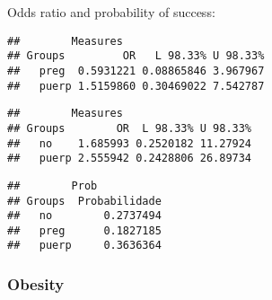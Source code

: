 \documentclass[
]{article}
\newenvironment{Shaded}{\begin{snugshade}}{\end{snugshade}}
\newcommand{\CommentTok}[1]{\textcolor[rgb]{0.56,0.35,0.01}{\textit{#1}}}
\newcommand{\KeywordTok}[1]{\textcolor[rgb]{0.13,0.29,0.53}{\textbf{#1}}}
\newcommand{\NormalTok}[1]{#1}
\newcommand{\OperatorTok}[1]{\textcolor[rgb]{0.81,0.36,0.00}{\textbf{#1}}}
\newcommand{\StringTok}[1]{\textcolor[rgb]{0.31,0.60,0.02}{#1}}
\begin{document}
Odds ratio and probability of success:

\begin{Shaded}
\end{Shaded}

\begin{verbatim}
##        Measures
## Groups         OR   L 98.33% U 98.33%
##   preg  0.5931221 0.08865846 3.967967
##   puerp 1.5159860 0.30469022 7.542787
\end{verbatim}

\begin{Shaded}
\end{Shaded}

\begin{verbatim}
##        Measures
## Groups        OR  L 98.33% U 98.33%
##   no    1.685993 0.2520182 11.27924
##   puerp 2.555942 0.2428806 26.89734
\end{verbatim}

\begin{Shaded}
\end{Shaded}

\begin{verbatim}
##        Prob
## Groups  Probabilidade
##   no        0.2737494
##   preg      0.1827185
##   puerp     0.3636364
\end{verbatim}

\hypertarget{obesity-1}{%
\subsubsection{Obesity}\label{obesity-1}}

\begin{Shaded}
\end{Shaded}
\end{document}
